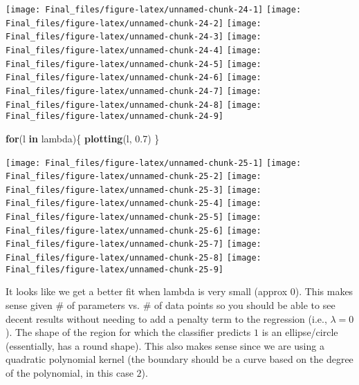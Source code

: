 \documentclass[]{article}
\newenvironment{Shaded}{\begin{snugshade}}{\end{snugshade}}
\newcommand{\ControlFlowTok}[1]{\textcolor[rgb]{0.13,0.29,0.53}{\textbf{#1}}}
\newcommand{\FloatTok}[1]{\textcolor[rgb]{0.00,0.00,0.81}{#1}}
\newcommand{\KeywordTok}[1]{\textcolor[rgb]{0.13,0.29,0.53}{\textbf{#1}}}
\newcommand{\NormalTok}[1]{#1}
\begin{document}
\begin{center}\texttt{[image: Final\_files/figure-latex/unnamed-chunk-24-1]} \texttt{[image: Final\_files/figure-latex/unnamed-chunk-24-2]} \texttt{[image: Final\_files/figure-latex/unnamed-chunk-24-3]} \texttt{[image: Final\_files/figure-latex/unnamed-chunk-24-4]} \texttt{[image: Final\_files/figure-latex/unnamed-chunk-24-5]} \texttt{[image: Final\_files/figure-latex/unnamed-chunk-24-6]} \texttt{[image: Final\_files/figure-latex/unnamed-chunk-24-7]} \texttt{[image: Final\_files/figure-latex/unnamed-chunk-24-8]} \texttt{[image: Final\_files/figure-latex/unnamed-chunk-24-9]} \end{center}

\begin{Shaded}
\begin{Highlighting}[]
\ControlFlowTok{for}\NormalTok{(l }\ControlFlowTok{in}\NormalTok{ lambda)\{}
  \KeywordTok{plotting}\NormalTok{(l, }\FloatTok{0.7}\NormalTok{)}
\NormalTok{\}}
\end{Highlighting}
\end{Shaded}

\begin{center}\texttt{[image: Final\_files/figure-latex/unnamed-chunk-25-1]} \texttt{[image: Final\_files/figure-latex/unnamed-chunk-25-2]} \texttt{[image: Final\_files/figure-latex/unnamed-chunk-25-3]} \texttt{[image: Final\_files/figure-latex/unnamed-chunk-25-4]} \texttt{[image: Final\_files/figure-latex/unnamed-chunk-25-5]} \texttt{[image: Final\_files/figure-latex/unnamed-chunk-25-6]} \texttt{[image: Final\_files/figure-latex/unnamed-chunk-25-7]} \texttt{[image: Final\_files/figure-latex/unnamed-chunk-25-8]} \texttt{[image: Final\_files/figure-latex/unnamed-chunk-25-9]} \end{center}

It looks like we get a better fit when lambda is very small (approx
\(0\)). This makes sense given \# of parameters vs. \# of data points so
you should be able to see decent results without needing to add a
penalty term to the regression (i.e., \(\lambda = 0\)). The shape of the
region for which the classifier predicts \(1\) is an ellipse/circle
(essentially, has a round shape). This also makes sense since we are
using a quadratic polynomial kernel (the boundary should be a curve
based on the degree of the polynomial, in this case \(2\)).
\end{document}
